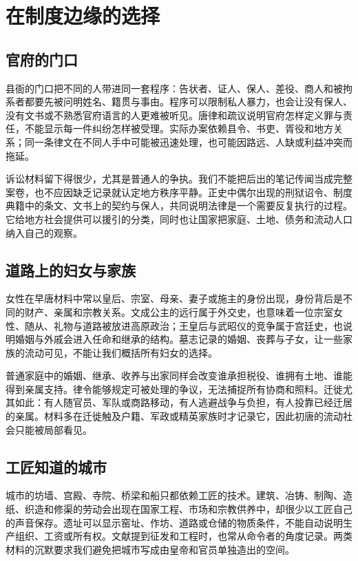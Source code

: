 \section{在制度边缘的选择}
\label{sec:early-tang-acceptance-depth-pages-four}

\subsection{官府的门口}
县衙的门口把不同的人带进同一套程序：告状者、证人、保人、差役、商人和被拘系者都要先被问明姓名、籍贯与事由。程序可以限制私人暴力，也会让没有保人、没有文书或不熟悉官府语言的人更难被听见。唐律和疏议说明官府怎样定义罪与责任，不能显示每一件纠纷怎样被受理。实际办案依赖县令、书吏、胥役和地方关系；同一条律文在不同人手中可能被迅速处理，也可能因路远、人缺或利益冲突而拖延。

诉讼材料留下得很少，尤其是普通人的争执。我们不能把后出的笔记传闻当成完整案卷，也不应因缺乏记录就认定地方秩序平静。正史中偶尔出现的刑狱诏令、制度典籍中的条文、文书上的契约与保人，共同说明法律是一个需要反复执行的过程。它给地方社会提供可以援引的分类，同时也让国家把家庭、土地、债务和流动人口纳入自己的观察。

\subsection{道路上的妇女与家族}
女性在早唐材料中常以皇后、宗室、母亲、妻子或施主的身份出现，身份背后是不同的财产、亲属和宗教关系。文成公主的远行属于外交史，也意味着一位宗室女性、随从、礼物与道路被放进高原政治；王皇后与武昭仪的竞争属于宫廷史，也说明婚姻与外戚会进入任命和继承的结构。墓志记录的婚姻、丧葬与子女，让一些家族的流动可见，不能让我们概括所有妇女的选择。

普通家庭中的婚姻、继承、收养与出家同样会改变谁承担税役、谁拥有土地、谁能得到亲属支持。律令能够规定可被处理的争议，无法捕捉所有协商和照料。迁徙尤其如此：有人随官员、军队或商路移动，有人逃避战争与负担，有人投靠已经迁居的亲属。材料多在迁徙触及户籍、军政或精英家族时才记录它，因此初唐的流动社会只能被局部看见。

\subsection{工匠知道的城市}
城市的坊墙、宫殿、寺院、桥梁和船只都依赖工匠的技术。建筑、冶铸、制陶、造纸、织造和修渠的劳动会出现在国家工程、市场和宗教供养中，却很少以工匠自己的声音保存。遗址可以显示窑址、作坊、道路或仓储的物质条件，不能自动说明生产组织、工资或所有权。文献提到征发和工程时，也常从命令者的角度记录。两类材料的沉默要求我们避免把城市写成由皇帝和官员单独造出的空间。

